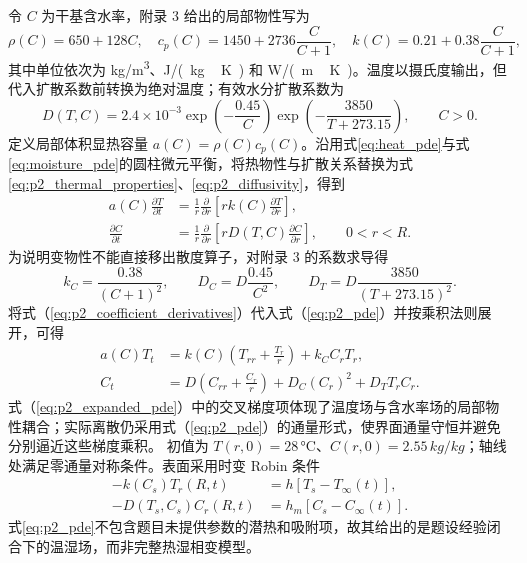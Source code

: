 \documentclass[withoutpreface,bwprint]{cumcmthesis}
\begin{document}
令 $C$ 为干基含水率，附录 3 给出的局部物性写为
\begin{equation}
\rho(C)=650+128C,\quad
c_p(C)=1450+2736\frac{C}{C+1},\quad
k(C)=0.21+0.38\frac{C}{C+1},
\label{eq:p2_thermal_properties}
\end{equation}
其中单位依次为 \si{kg/m^3}、\si{J/(kg\,K)} 和 \si{W/(m\,K)}。温度以摄氏度输出，但代入扩散系数前转换为绝对温度；有效水分扩散系数为
\begin{equation}
D(T,C)=2.4\times10^{-3}
\exp\left(-\frac{0.45}{C}\right)
\exp\left(-\frac{3850}{T+273.15}\right),\qquad C>0.
\label{eq:p2_diffusivity}
\end{equation}
定义局部体积显热容量 $a(C)=\rho(C)c_p(C)$。沿用式\eqref{eq:heat_pde}与式\eqref{eq:moisture_pde}的圆柱微元平衡，将热物性与扩散关系替换为式\eqref{eq:p2_thermal_properties}、\eqref{eq:p2_diffusivity}，得到
\begin{equation}
\begin{aligned}
a(C)\frac{\partial T}{\partial t}
&=\frac{1}{r}\frac{\partial}{\partial r}
\left[rk(C)\frac{\partial T}{\partial r}\right],\\
\frac{\partial C}{\partial t}
&=\frac{1}{r}\frac{\partial}{\partial r}
\left[rD(T,C)\frac{\partial C}{\partial r}\right],\qquad 0<r<R.
\end{aligned}
\label{eq:p2_pde}
\end{equation}
为说明变物性不能直接移出散度算子，对附录 3 的系数求导得
\begin{equation}
k_C=\frac{0.38}{(C+1)^2},\qquad
D_C=D\frac{0.45}{C^2},\qquad
D_T=D\frac{3850}{(T+273.15)^2}.
\label{eq:p2_coefficient_derivatives}
\end{equation}
将式（\ref{eq:p2_coefficient_derivatives}）代入式（\ref{eq:p2_pde}）并按乘积法则展开，可得
\begin{equation}
\begin{aligned}
a(C)T_t&=k(C)\left(T_{rr}+\frac{T_r}{r}\right)+k_CC_rT_r,\\
C_t&=D\left(C_{rr}+\frac{C_r}{r}\right)+D_C(C_r)^2+D_TT_rC_r.
\end{aligned}
\label{eq:p2_expanded_pde}
\end{equation}
式（\ref{eq:p2_expanded_pde}）中的交叉梯度项体现了温度场与含水率场的局部物性耦合；实际离散仍采用式（\ref{eq:p2_pde}）的通量形式，使界面通量守恒并避免分别逼近这些梯度乘积。
初值为 $T(r,0)=28\,\si{\celsius}$、$C(r,0)=2.55\,\si{kg/kg}$；轴线处满足零通量对称条件。表面采用时变 Robin 条件
\begin{equation}
\begin{aligned}
-k(C_s)T_r(R,t)&=h[T_s-T_\infty(t)],\\
-D(T_s,C_s)C_r(R,t)&=h_m[C_s-C_\infty(t)].
\end{aligned}
\label{eq:p2_robin}
\end{equation}
式\eqref{eq:p2_pde}不包含题目未提供参数的潜热和吸附项，故其给出的是题设经验闭合下的温湿场，而非完整热湿相变模型。
\end{document}
